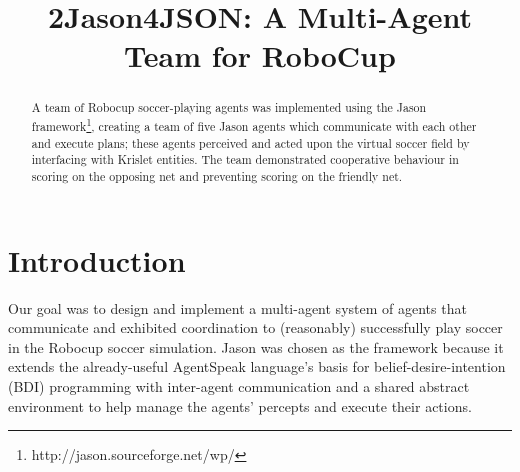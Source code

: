 \documentclass[conference]{IEEEtran}
\begin{document}
	
	\title{2Jason4JSON: A Multi-Agent Team for RoboCup}
	
	\author{
		\and
		\and
		\and
	}
	
	\maketitle
	
	\begin{abstract}
		A team of Robocup soccer-playing agents was implemented using the Jason framework\footnote{http://jason.sourceforge.net/wp/}, creating a team of five Jason agents which communicate with each other and execute plans; these agents perceived and acted upon the virtual soccer field by interfacing with Krislet entities. The team demonstrated cooperative behaviour in scoring on the opposing net and preventing scoring on the friendly net.
	\end{abstract}
	
	\section{Introduction}
	Our goal was to design and implement a multi-agent system of agents that communicate and exhibited coordination to (reasonably) successfully play soccer in the Robocup soccer simulation. Jason was chosen as the framework because it extends the already-useful AgentSpeak language’s basis for belief-desire-intention (BDI) programming with inter-agent communication and a shared abstract environment to help manage the agents’ percepts and execute their actions. 
	
\end{document}
